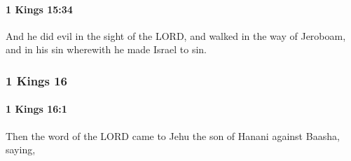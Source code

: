 		\paragraph{1 Kings 15:34} %
			\label{1KINGS-15-34}

			And he did evil in the sight of the LORD, and walked in the way of Jeroboam, and in his sin wherewith he made Israel to sin.

	\subsubsection{1 Kings 16} %
		\label{1KINGS-16}

		\paragraph{1 Kings 16:1} %
			\label{1KINGS-16-1}

			Then the word of the LORD came to Jehu the son of Hanani against Baasha, saying,

